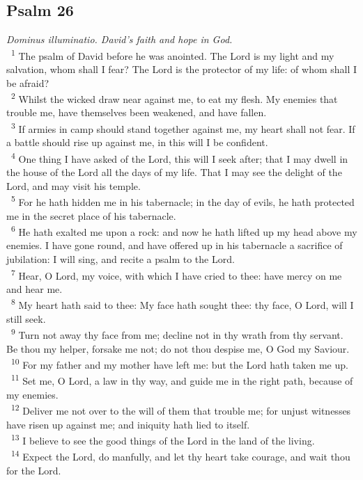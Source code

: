 \documentclass[a5paper,12pt]{article}
\begin{document}
\begin{multicols*}{2}
\section{Psalm 26}
\label{sec:org7680fe8}
\emph{Dominus illuminatio. David's faith and hope in God.}\\

~\textsuperscript{1} The psalm of David before he was anointed. The Lord is my light and my salvation, whom shall I fear? The Lord is the protector of my life: of whom shall I be afraid?\\
~\textsuperscript{2} Whilst the wicked draw near against me, to eat my flesh. My enemies that trouble me, have themselves been weakened, and have fallen.\\
~\textsuperscript{3} If armies in camp should stand together against me, my heart shall not fear. If a battle should rise up against me, in this will I be confident.\\
~\textsuperscript{4} One thing I have asked of the Lord, this will I seek after; that I may dwell in the house of the Lord all the days of my life. That I may see the delight of the Lord, and may visit his temple.\\
~\textsuperscript{5} For he hath hidden me in his tabernacle; in the day of evils, he hath protected me in the secret place of his tabernacle.\\
~\textsuperscript{6} He hath exalted me upon a rock: and now he hath lifted up my head above my enemies. I have gone round, and have offered up in his tabernacle a sacrifice of jubilation: I will sing, and recite a psalm to the Lord.\\
~\textsuperscript{7} Hear, O Lord, my voice, with which I have cried to thee: have mercy on me and hear me.\\
~\textsuperscript{8} My heart hath said to thee: My face hath sought thee: thy face, O Lord, will I still seek.\\
~\textsuperscript{9} Turn not away thy face from me; decline not in thy wrath from thy servant. Be thou my helper, forsake me not; do not thou despise me, O God my Saviour.\\
~\textsuperscript{10} For my father and my mother have left me: but the Lord hath taken me up.\\
~\textsuperscript{11} Set me, O Lord, a law in thy way, and guide me in the right path, because of my enemies.\\
~\textsuperscript{12} Deliver me not over to the will of them that trouble me; for unjust witnesses have risen up against me; and iniquity hath lied to itself.\\
~\textsuperscript{13} I believe to see the good things of the Lord in the land of the living.\\
~\textsuperscript{14} Expect the Lord, do manfully, and let thy heart take courage, and wait thou for the Lord.\\


\end{multicols*}
\end{document}
